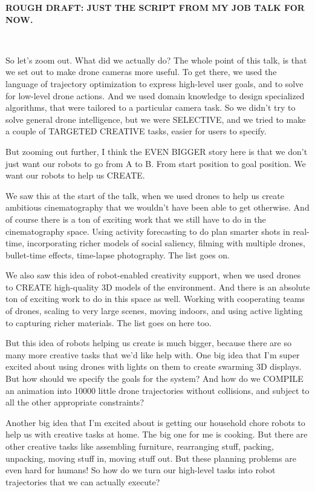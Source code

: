 \textbf{ROUGH DRAFT: JUST THE SCRIPT FROM MY JOB TALK FOR NOW.}

~

\hspace{-15pt}So let’s zoom out. What did we actually do?
The whole point of this talk, is that we set out to make drone cameras more useful.
To get there, we used the language of trajectory optimization to express high-level user goals, and to solve for low-level drone actions.
And we used domain knowledge to design specialized algorithms, that were tailored to a particular camera task.
So we didn’t try to solve general drone intelligence, but we were SELECTIVE, and we tried to make a couple of TARGETED CREATIVE tasks, easier for users to specify.

But zooming out further, I think the EVEN BIGGER story here is that we don’t just want our robots to go from A to B.
From start position to goal position.
We want our robots to help us CREATE.

We saw this at the start of the talk, when we used drones to help us create ambitious cinematography that we wouldn’t have been able to get otherwise.
And of course there is a ton of exciting work that we still have to do in the cinematography space.
Using activity forecasting to do plan smarter shots in real-time, incorporating richer models of social saliency, filming with multiple drones, bullet-time effects, time-lapse photography.
The list goes on.

We also saw this idea of robot-enabled creativity support, when we used drones to CREATE high-quality 3D models of the environment.
And there is an absolute ton of exciting work to do in this space as well.
Working with cooperating teams of drones, scaling to very large scenes, moving indoors, and using active lighting to capturing richer materials.
The list goes on here too.

But this idea of robots helping us create is much bigger, because there are so many more creative tasks that we’d like help with.
One big idea that I’m super excited about using drones with lights on them to create swarming 3D displays.
But how should we specify the goals for the system?
And how do we COMPILE an animation into 10000 little drone trajectories without collisions, and subject to all the other appropriate constraints?

Another big idea that I’m excited about is getting our household chore robots to help us with creative tasks at home.
The big one for me is cooking.
But there are other creative tasks like assembling furniture, rearranging stuff, packing, unpacking, moving stuff in, moving stuff out.
But these planning problems are even hard for humans!
So how do we turn our high-level tasks into robot trajectories that we can actually execute?

